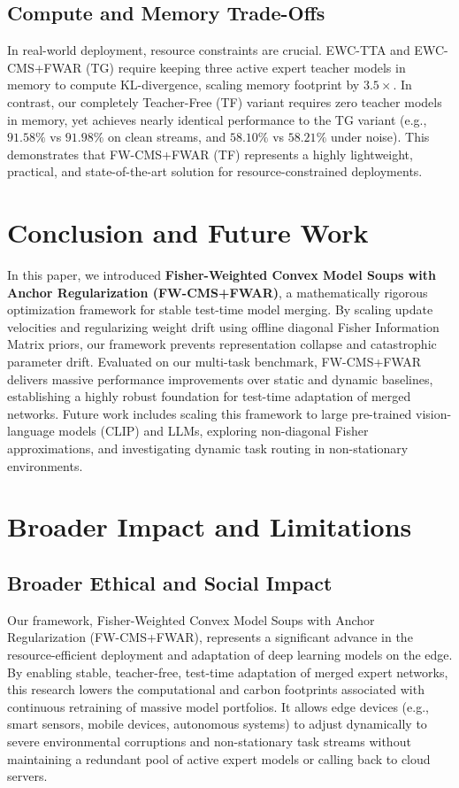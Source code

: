 \documentclass{article}
\begin{document}
\subsection{Compute and Memory Trade-Offs}
In real-world deployment, resource constraints are crucial. EWC-TTA and EWC-CMS+FWAR (TG) require keeping three active expert teacher models in memory to compute KL-divergence, scaling memory footprint by $3.5\times$. In contrast, our completely Teacher-Free (TF) variant requires zero teacher models in memory, yet achieves nearly identical performance to the TG variant (e.g., $91.58\%$ vs $91.98\%$ on clean streams, and $58.10\%$ vs $58.21\%$ under noise). This demonstrates that FW-CMS+FWAR (TF) represents a highly lightweight, practical, and state-of-the-art solution for resource-constrained deployments.

\section{Conclusion and Future Work}
\label{sec:conclusion}
In this paper, we introduced \textbf{Fisher-Weighted Convex Model Soups with Anchor Regularization (FW-CMS+FWAR)}, a mathematically rigorous optimization framework for stable test-time model merging. By scaling update velocities and regularizing weight drift using offline diagonal Fisher Information Matrix priors, our framework prevents representation collapse and catastrophic parameter drift. Evaluated on our multi-task benchmark, FW-CMS+FWAR delivers massive performance improvements over static and dynamic baselines, establishing a highly robust foundation for test-time adaptation of merged networks. Future work includes scaling this framework to large pre-trained vision-language models (CLIP) and LLMs, exploring non-diagonal Fisher approximations, and investigating dynamic task routing in non-stationary environments.
\clearpage
\nocite{*}



\newpage
\appendix
\onecolumn
\section{Broader Impact and Limitations}
\label{sec:appendix}

\subsection{Broader Ethical and Social Impact}
Our framework, Fisher-Weighted Convex Model Soups with Anchor Regularization (FW-CMS+FWAR), represents a significant advance in the resource-efficient deployment and adaptation of deep learning models on the edge. By enabling stable, teacher-free, test-time adaptation of merged expert networks, this research lowers the computational and carbon footprints associated with continuous retraining of massive model portfolios. It allows edge devices (e.g., smart sensors, mobile devices, autonomous systems) to adjust dynamically to severe environmental corruptions and non-stationary task streams without maintaining a redundant pool of active expert models or calling back to cloud servers.
\end{document}
